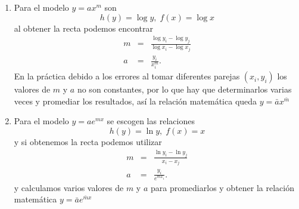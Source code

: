 \documentclass[12pt]{article}
\begin{document}
\begin{enumerate}
\begin{enumerate}
\item  Para el modelo $y=ax^{m}$ son 
\begin{equation*}
h\left( y\right) =\log y,\;f\left( x\right) =\log x
\end{equation*}
al obtener la recta podemos
encontrar 
\begin{eqnarray*}
m &=&\frac{\log y_{i}-\log y_{j}}{\log x_{i}-\log x_{j}} \\
a &=&\frac{y_{i}}{x_{i}^{m}}.
\end{eqnarray*}
En la pr\'{a}ctica debido a los errores al tomar diferentes parejas $\left(
x_{i},y_{i}\right) $ los valores de $m$ y $a$ no son constantes, por lo que
hay que determinarlos varias veces y promediar los resultados, as\'{i} la
relaci\'{o}n matem\'{a}tica queda $y=\bar{a}x^{\bar{m}}$

\item  Para el modelo $y=ae^{mx}$ se escogen las relaciones 
\begin{equation*}
h\left( y\right) =\ln y,\;f\left( x\right) =x
\end{equation*}
y si obtenemos la recta podemos utilizar 
\begin{eqnarray*}
m &=&\frac{\ln y_{i}-\ln y_{j}}{x_{i}-x_{j}} \\
a &=&\frac{y_{i}}{e^{mx_{i}}}.
\end{eqnarray*}
y calculamos varios valores de $m$ y $a$ para promediarlos y obtener la
relaci\'{o}n matem\'{a}tica $y=\bar{a}e^{\bar{m}x}$


\end{enumerate}
\end{enumerate}
\end{document}
